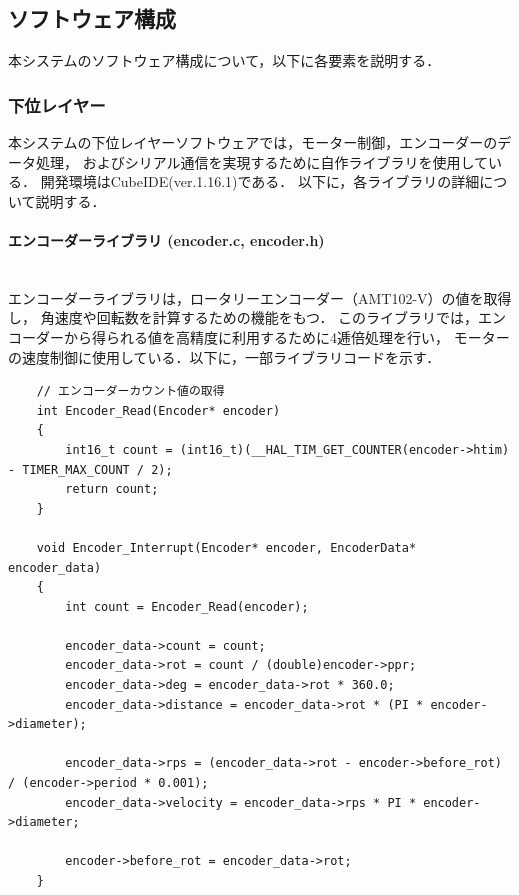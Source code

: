 
\subsection{ソフトウェア構成}
本システムのソフトウェア構成について，以下に各要素を説明する．


\subsubsection{下位レイヤー}
本システムの下位レイヤーソフトウェアでは，モーター制御，エンコーダーのデータ処理，
およびシリアル通信を実現するために自作ライブラリを使用している．
開発環境はCubeIDE(ver.1.16.1)である．
以下に，各ライブラリの詳細について説明する．

\paragraph{エンコーダーライブラリ (encoder.c, encoder.h)}\mbox{}\\
エンコーダーライブラリは，ロータリーエンコーダー（AMT102-V）の値を取得し，
角速度や回転数を計算するための機能をもつ．
このライブラリでは，エンコーダーから得られる値を高精度に利用するために4逓倍処理を行い，
モーターの速度制御に使用している．以下に，一部ライブラリコードを示す．



\begin{lstlisting}
    // エンコーダーカウント値の取得
    int Encoder_Read(Encoder* encoder)
    {
        int16_t count = (int16_t)(__HAL_TIM_GET_COUNTER(encoder->htim) - TIMER_MAX_COUNT / 2);
        return count;
    }
    
    void Encoder_Interrupt(Encoder* encoder, EncoderData* encoder_data)
    {
        int count = Encoder_Read(encoder);
    
        encoder_data->count = count;
        encoder_data->rot = count / (double)encoder->ppr;
        encoder_data->deg = encoder_data->rot * 360.0;
        encoder_data->distance = encoder_data->rot * (PI * encoder->diameter);
    
        encoder_data->rps = (encoder_data->rot - encoder->before_rot) / (encoder->period * 0.001);
        encoder_data->velocity = encoder_data->rps * PI * encoder->diameter;
    
        encoder->before_rot = encoder_data->rot;
    }
\end{lstlisting}

